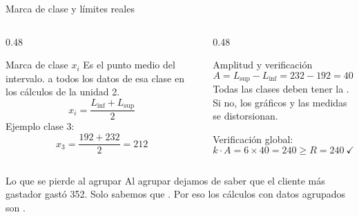 \documentclass[aspectratio=169,10pt]{beamer}
\begin{document}
\begin{frame}{Marca de clase y límites reales}
  \begin{columns}[T,onlytextwidth]
    \begin{column}{0.48\textwidth}
      \begin{block}{Marca de clase $x_i$}
        \footnotesize
        Es el punto medio del intervalo.  a todos los datos de
        esa clase en los cálculos de la unidad 2.
        \[ x_i = \frac{L_{\text{inf}} + L_{\text{sup}}}{2} \]
        Ejemplo clase 3:
        \[ x_3 = \frac{192+232}{2} = 212 \]
      \end{block}
    \end{column}
    \begin{column}{0.48\textwidth}
      \begin{exampleblock}{Amplitud y verificación}
        \footnotesize
        \[ A = L_{\text{sup}} - L_{\text{inf}} = 232-192 = 40 \]
        Todas las clases deben tener la . Si no, los
        gráficos y las medidas se distorsionan.

        \vspace{0.15cm}
        Verificación global:
        \[ k \cdot A = 6 \times 40 = 240 \ge R = 240 \ \checkmark \]
      \end{exampleblock}
    \end{column}
  \end{columns}

  \vspace{0.1cm}
  \begin{alertblock}{Lo que se pierde al agrupar}
    \scriptsize
    Al agrupar dejamos de saber que el cliente más gastador gastó 352. Solo
    sabemos que . Por eso los
    cálculos con datos agrupados son .
  \end{alertblock}
\end{frame}
\end{document}
